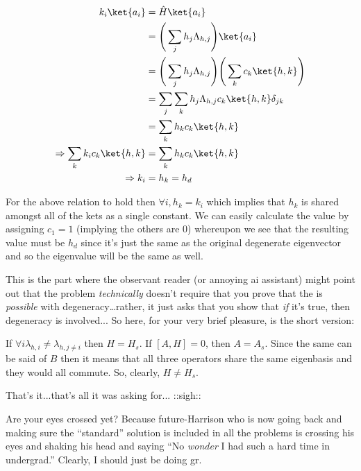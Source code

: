 \begin{answer}
\begin{answerpart}{\ctrois{}}
    \begin{equation}
      \begin{split}
        k_i \ket{a_i}
        &= \hat{H} \ket{a_i}\\
        &=
        \Bigg(\sum_j h_{j}\Lambda_{h,j}\Bigg)
        \ket{a_i}
        \\
        &=
        \Bigg(\sum_j h_{j}\Lambda_{h,j}\Bigg)
        \Bigg(\sum_k c_{k} \ket{h,k}\Bigg)
        \\
        &=
        \sum_j \sum_k
        h_{j}\Lambda_{h,j}
        c_{k} \ket{h,k}
        \delta_{jk}
        \\
        &= \sum_k h_{k} c_{k} \ket{h,k}\\
        \Rightarrow
        \sum_k k_{i} c_{k} \ket{h,k}
        &= \sum_k h_{k} c_{k} \ket{h,k}\\
        \Rightarrow
        k_{i} &= h_{k} = h_d\\
      \end{split}
    \end{equation}

    For the above relation to hold then $\forall i, h_k = k_i$ which
    implies that $h_k$ is shared amongst all of the kets as a single
    constant.  We can easily calculate the value by assigning $c_1 =
    1$ (implying the others are 0) whereupon we see that the resulting
    value must be $h_d$ since it's just the same as the original
    degenerate eigenvector and so the eigenvalue will be the same as
    well.

    This is the part where the observant reader (or annoying ai
    assistant) might point out that the problem \emph{technically}
    doesn't require that you prove that the \ctrois{} is
    \emph{possible} with degeneracy\ldots rather, it just asks that
    you show that \emph{if} it's true, then degeneracy is
    involved... So here, for your very brief pleasure, is the short
    version:

    If $\forall i \lambda_{h,i} \ne \lambda_{h,j \ne i}$ then $H =
    H_s$.  If $[A, H] = 0$, then $A = A_s$.  Since the same can be
    said of $B$ then it means that all three operators share the same
    eigenbasis and they would all commute.  So, clearly, $H \ne H_s$.

    That's it...that's all it was asking for... ::sigh::

    Are your eyes crossed yet?  Because future-Harrison who is now
    going back and making sure the ``standard'' solution is included
    in all the problems is crossing his eyes and shaking his head and
    saying ``No \emph{wonder} I had such a hard time in undergrad.''
    Clearly, I should just be doing \ac{gr}.


\end{answerpart}
\end{answer}
